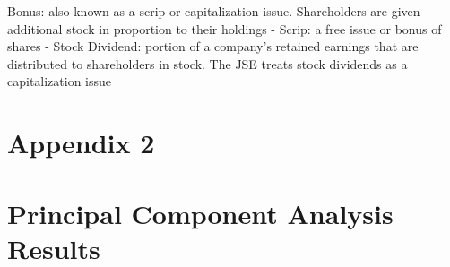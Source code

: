 \documentclass[11pt,preprint, authoryear]{elsarticle}
\numberwithin{equation}{section}
\numberwithin{figure}{section}
\numberwithin{table}{section}
\begin{document}
Bonus: also known as a scrip or capitalization issue. Shareholders are
given additional stock in proportion to their holdings - Scrip: a free
issue or bonus of shares - Stock Dividend: portion of a company's
retained earnings that are distributed to shareholders in stock. The JSE
treats stock dividends as a capitalization issue \newpage

\hypertarget{appendix-2}{%
\section*{Appendix 2}\label{appendix-2}}

\hypertarget{principal-component-analysis-results}{%
\section*{Principal Component Analysis
Results}\label{principal-component-analysis-results}}
\end{document}
